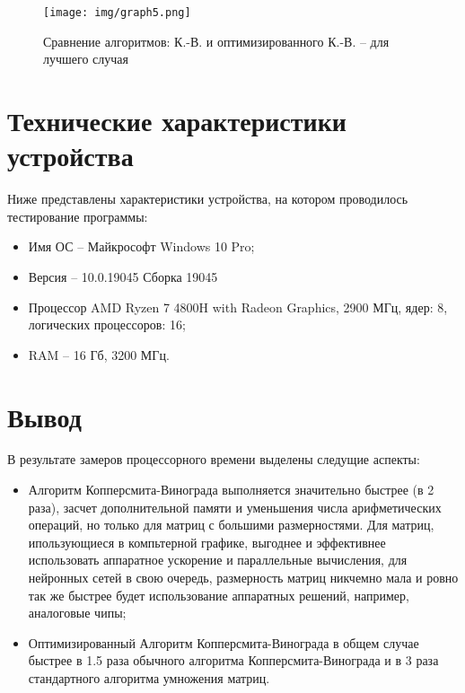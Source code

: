 \FloatBarrier

\begin{figure}[ht]
	\centering
	\texttt{[image: img/graph5.png]}
	\caption{Сравнение алгоритмов: К.-В. и оптимизированного К.-В. -- для лучшего случая}
	\label{img:graph5}
\end{figure}

\FloatBarrier

\section{Технические характеристики устройства}

Ниже представлены характеристики устройства,
на котором проводилось тестирование программы:

\begin{itemize}
	\item Имя ОС -- Майкрософт Windows 10 Pro;
	\item Версия -- 10.0.19045 Сборка 19045
	\item Процессор	AMD Ryzen 7 4800H with Radeon Graphics, 2900 МГц, ядер: 8, логических процессоров: 16;
	\item RAM -- 16 Гб, 3200 МГц.
\end{itemize}

\section{Вывод}

В результате замеров процессорного времени выделены следущие аспекты:

\begin{itemize}
	\item Алгоритм Копперсмита-Винограда выполняется значительно быстрее (в 2 раза), засчет дополнительной памяти и
	уменьшения числа арифметических операций, но только для матриц с большими размерностями. Для матриц,
	ипользующиеся в компьтерной графике, выгоднее и эффективнее использовать аппаратное ускорение и параллельные вычисления,
	для нейронных сетей в свою очередь, размерность матриц никчемно мала и ровно так же быстрее будет использование
	аппаратных решений, например, аналоговые чипы;
	\item Оптимизированный Алгоритм Копперсмита-Винограда в общем случае быстрее в 1.5 раза обычного алгоритма Копперсмита-Винограда
	и в 3 раза стандартного алгоритма умножения матриц.
\end{itemize}

